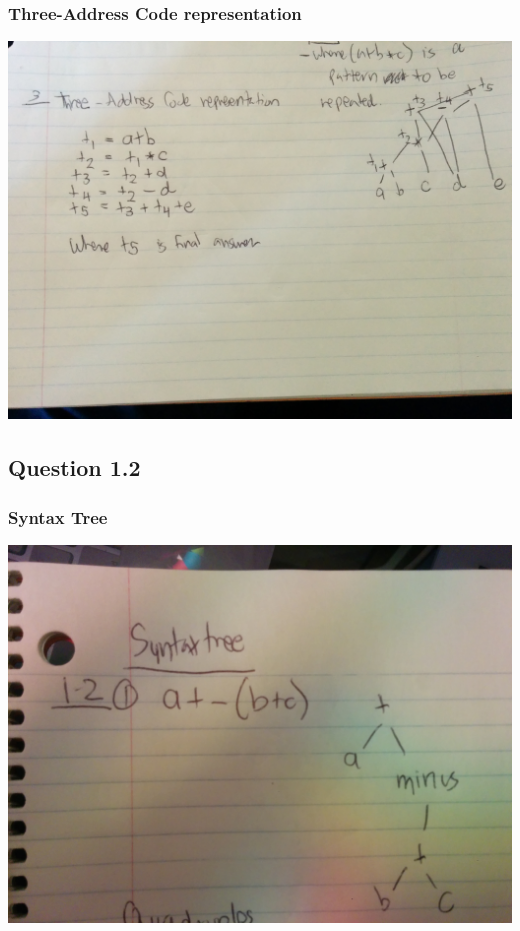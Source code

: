 \documentclass[11pt, oneside]{article}   	%
\begin{document}
\subsubsection{Three-Address Code representation}
\includegraphics[scale=0.15]{IMG_20141025_154609.jpg}

\subsection{Question 1.2}

\subsubsection{Syntax Tree}
\includegraphics[scale=0.15]{IMG_20141028_235513.jpg}
\end{document}
